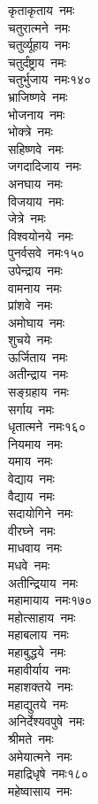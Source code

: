 \begin{multicols}{2}
\begin{flushleft}
कृताकृताय~नमः\\
चतुरात्मने~नमः\\
चतुर्व्यूहाय~नमः\\
चतुर्दंष्ट्राय~नमः\\
चतुर्भुजाय~नमः\hfill १४०\\
भ्राजिष्णवे~नमः\\
भोजनाय~नमः\\
भोक्त्रे~नमः\\
सहिष्णवे~नमः\\
जगदादिजाय~नमः\\
अनघाय~नमः\\
विजयाय~नमः\\
जेत्रे~नमः\\
विश्वयोनये~नमः\\
पुनर्वसवे~नमः\hfill १५०\\
उपेन्द्राय~नमः\\
वामनाय~नमः\\
प्रांशवे~नमः\\
अमोघाय~नमः\\
शुचये~नमः\\
ऊर्जिताय~नमः\\
अतीन्द्राय~नमः\\
सङ्ग्रहाय~नमः\\
सर्गाय~नमः\\
धृतात्मने~नमः\hfill १६०\\
नियमाय~नमः\\
यमाय~नमः\\
वेद्याय~नमः\\
वैद्याय~नमः\\
सदायोगिने~नमः\\
वीरघ्ने~नमः\\
माधवाय~नमः\\
मधवे~नमः\\
अतीन्द्रियाय~नमः\\
महामायाय~नमः\hfill १७०\\
महोत्साहाय~नमः\\
महाबलाय~नमः\\
महाबुद्धये~नमः\\
महावीर्याय~नमः\\
महाशक्तये~नमः\\
महाद्युतये~नमः\\
अनिर्देश्यवपुषे~नमः\\
श्रीमते~नमः\\
अमेयात्मने~नमः\\
महाद्रिधृषे~नमः\hfill १८०\\
महेष्वासाय~नमः\\

\end{flushleft}
\end{multicols}
